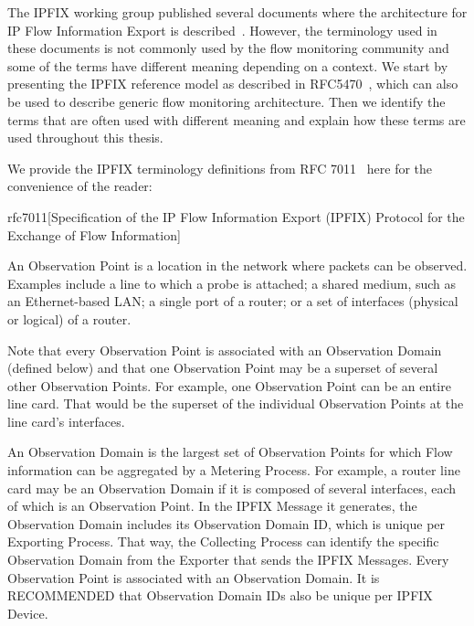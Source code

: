 The IPFIX working group published several documents where the architecture for IP Flow Information Export is described~\cite{rfc5470, rfc6183}. However, the terminology used in these documents is not commonly used by the flow monitoring community and some of the terms have different meaning depending on a context. We start by presenting the IPFIX reference model as described in RFC5470~\cite{rfc5470}, which can also be used to describe generic flow monitoring architecture. Then we identify the terms that are often used with different meaning and explain how these terms are used throughout this thesis.

We provide the IPFIX terminology definitions from RFC 7011~\cite{rfc7011} here for the convenience of the reader:

\begin{displaycquote}{rfc7011}[Specification of the IP Flow Information Export (IPFIX) Protocol for the Exchange of Flow Information]

	\begin{description}[style=nextline]
		\item[Observation Point]
      An Observation Point is a location in the network where packets
      can be observed.  Examples include a line to which a probe is
      attached; a shared medium, such as an Ethernet-based LAN; a single
      port of a router; or a set of interfaces (physical or logical) of
      a router.

      Note that every Observation Point is associated with an
      Observation Domain (defined below) and that one Observation Point
      may be a superset of several other Observation Points.  For
      example, one Observation Point can be an entire line card.  That
      would be the superset of the individual Observation Points at the
      line card's interfaces.
      
		\item[Observation Domain]
      An Observation Domain is the largest set of Observation Points for
      which Flow information can be aggregated by a Metering Process.
      For example, a router line card may be an Observation Domain if it
      is composed of several interfaces, each of which is an Observation
      Point.  In the IPFIX Message it generates, the Observation Domain
      includes its Observation Domain ID, which is unique per Exporting
      Process.  That way, the Collecting Process can identify the
      specific Observation Domain from the Exporter that sends the IPFIX
      Messages.  Every Observation Point is associated with an
      Observation Domain.  It is RECOMMENDED that Observation Domain IDs
      also be unique per IPFIX Device.


\end{description}
\end{displaycquote}
